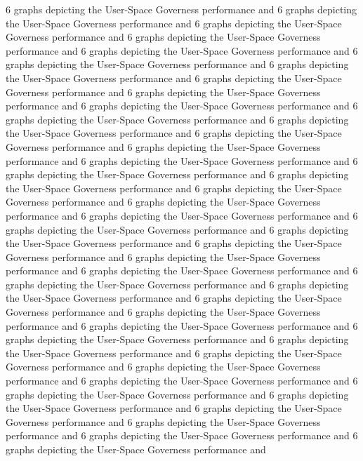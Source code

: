 6 graphs depicting the User-Space Governess performance and 
6 graphs depicting the User-Space Governess performance and 
6 graphs depicting the User-Space Governess performance and 
6 graphs depicting the User-Space Governess performance and 
6 graphs depicting the User-Space Governess performance and 
6 graphs depicting the User-Space Governess performance and 
6 graphs depicting the User-Space Governess performance and 
6 graphs depicting the User-Space Governess performance and 
6 graphs depicting the User-Space Governess performance and 
6 graphs depicting the User-Space Governess performance and 
6 graphs depicting the User-Space Governess performance and 
6 graphs depicting the User-Space Governess performance and 
6 graphs depicting the User-Space Governess performance and 
6 graphs depicting the User-Space Governess performance and 
6 graphs depicting the User-Space Governess performance and 
6 graphs depicting the User-Space Governess performance and 
6 graphs depicting the User-Space Governess performance and 
6 graphs depicting the User-Space Governess performance and 
6 graphs depicting the User-Space Governess performance and 
6 graphs depicting the User-Space Governess performance and 
6 graphs depicting the User-Space Governess performance and 
6 graphs depicting the User-Space Governess performance and 
6 graphs depicting the User-Space Governess performance and 
6 graphs depicting the User-Space Governess performance and 
6 graphs depicting the User-Space Governess performance and 
6 graphs depicting the User-Space Governess performance and 
6 graphs depicting the User-Space Governess performance and 
6 graphs depicting the User-Space Governess performance and 
6 graphs depicting the User-Space Governess performance and 
6 graphs depicting the User-Space Governess performance and 
6 graphs depicting the User-Space Governess performance and 
6 graphs depicting the User-Space Governess performance and 
6 graphs depicting the User-Space Governess performance and 
6 graphs depicting the User-Space Governess performance and 
6 graphs depicting the User-Space Governess performance and 
6 graphs depicting the User-Space Governess performance and 
6 graphs depicting the User-Space Governess performance and 
6 graphs depicting the User-Space Governess performance and 
6 graphs depicting the User-Space Governess performance and 
6 graphs depicting the User-Space Governess performance and 
6 graphs depicting the User-Space Governess performance and 


